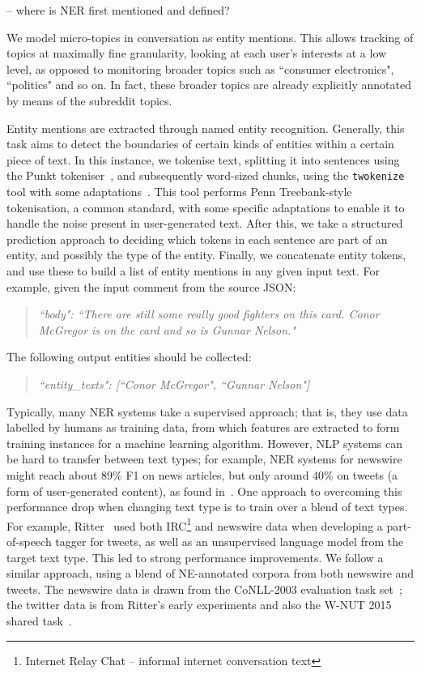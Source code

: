 \documentclass[journal,10pt,draftclsnofoot,onecolumn]{IEEEtran}
\begin{document}
-- where is NER first mentioned and defined?

We model micro-topics in conversation as entity mentions.
This allows tracking of topics at maximally fine granularity, looking at each user's interests at a low level, as opposed to monitoring broader topics such as ``consumer electronics", ``politics" and so on.
In fact, these broader topics are already explicitly annotated by means of the subreddit topics.

Entity mentions are extracted through named entity recognition.
Generally, this task aims to detect the boundaries of certain kinds of entities within a certain piece of text.
In this instance, we tokenise text, splitting it into sentences using the Punkt tokeniser~\cite{kiss2006unsupervised}, and subsequently word-sized chunks, using the {\tt twokenize} tool with some adaptations~\cite{o2010tweetmotif}.
This tool performs Penn Treebank-style tokenisation, a common standard, with some specific adaptations to enable it to handle the noise present in user-generated text.
After this, we take a structured prediction approach to deciding which tokens in each sentence are part of an entity, and possibly the type of the entity.
Finally, we concatenate entity tokens, and use these to build a list of entity mentions in any given input text.
For example, given the input comment from the source JSON:

\begin{quote}
\emph{``body": ``There are still some really good fighters on this card. Conor McGregor is on the card and so is Gunnar Nelson."}
\end{quote}

The following output entities should be collected:

\begin{quote}
\emph{``entity\_texts": [``Conor McGregor", ``Gunnar Nelson"]}
\end{quote}

Typically, many NER systems take a supervised approach; that is, they use data labelled by humans as training data, from which features are extracted to form training instances for a machine learning algorithm.
However, NLP systems can be hard to transfer between text types; for example, NER systems for newswire might reach about 89\% F1 on news articles, but only around 40\% on tweets (a form of user-generated content), as found in~\cite{derczynski2015analysis}.
One approach to overcoming this performance drop when changing text type is to train over a blend of text types.
For example, Ritter~\cite{ritter2011named} used both IRC\footnote{Internet Relay Chat -- informal internet conversation text} and newswire data when developing a part-of-speech tagger for tweets, as well as an unsupervised language model from the target text type.
This led to strong performance improvements.
We follow a similar approach, using a blend of NE-annotated corpora from both newswire and tweets.
The newswire data is drawn from the CoNLL-2003 evaluation task set~\cite{tjong2003introduction}; the twitter data is from Ritter's early experiments and also the W-NUT 2015 shared task~\cite{ritter2011named,baldwin2015shared}.
\end{document}
